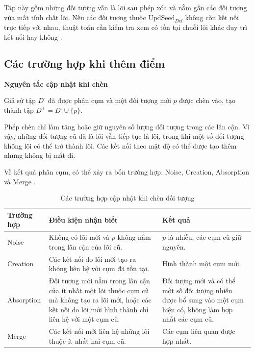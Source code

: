 Tập này gồm những đối tượng vẫn là lõi sau phép xóa và nằm gần các đối tượng vừa mất tính chất lõi. Nếu các đối tượng thuộc \(\mathrm{UpdSeed}_{Del}\) không còn kết nối trực tiếp với nhau, thuật toán cần kiểm tra xem có tồn tại chuỗi lõi khác duy trì kết nối hay không \parencite{ester1998incrementaldbscan}.


\subsection{Các trường hợp khi thêm điểm}

\textbf{Nguyên tắc cập nhật khi chèn}

Giả sử tập \(D^{\text{-}}\) đã được phân cụm và một đối tượng mới \(p\) được chèn vào, tạo thành tập \(D^{+}=D^{\text{-}}\cup\{p\}\).

Phép chèn chỉ làm tăng hoặc giữ nguyên số lượng đối tượng trong các lân cận. Vì vậy, những đối tượng cũ đã là lõi vẫn tiếp tục là lõi, trong khi một số đối tượng không lõi có thể trở thành lõi. Các kết nối theo mật độ có thể được tạo thêm nhưng không bị mất đi.

Về kết quả phân cụm, có thể xảy ra bốn trường hợp: Noise, Creation, Absorption và Merge \parencite{ester1998incrementaldbscan}.

\begin{table}[H]
\centering
\caption{Các trường hợp cập nhật khi chèn đối tượng}
\label{tab:incremental_insert_cases}
\normalsize
\begin{tabularx}{\textwidth}{|P{2.5cm}|Y|Y|}\hline
\textbf{Trường hợp} & \textbf{Điều kiện nhận biết} & \textbf{Kết quả} \\\hline
Noise &
Không có lõi mới và \(p\) không nằm trong lân cận của lõi cũ. &
\(p\) là nhiễu, các cụm cũ giữ nguyên. \\\hline
Creation &
Các kết nối do lõi mới tạo ra không liên hệ với cụm đã tồn tại. &
Hình thành một cụm mới. \\\hline
Absorption &
Đối tượng mới nằm trong lân cận của ít nhất một lõi thuộc cụm cũ mà không tạo ra lõi mới, hoặc các kết nối do lõi mới hình thành chỉ liên hệ với một cụm cũ. &
Đối tượng mới và có thể một số đối tượng nhiễu được bổ sung vào một cụm hiện có, không làm hợp nhất các cụm cũ. \\\hline
Merge &
Các kết nối mới liên hệ những lõi thuộc ít nhất hai cụm cũ. &
Các cụm liên quan được hợp nhất. \\\hline
\end{tabularx}
\end{table}

